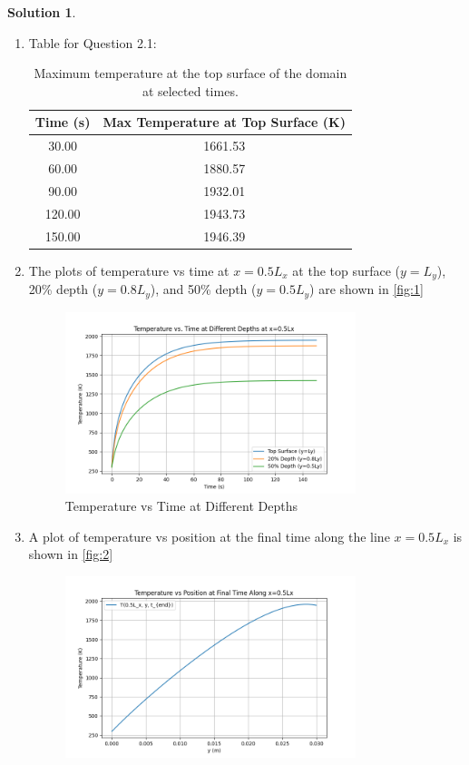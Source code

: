 \documentclass[12pt]{article}
\theoremstyle{definition} %
\newtheorem{solution}{Solution}
\theoremstyle{plain} %
\begin{document}
\begin{solution}
\begin{enumerate}
        \item Table for Question 2.1: \begin{table}[h!]
            \centering
            \begin{tabular}{|c|c|}
                \hline
                Time (s) & Max Temperature at Top Surface (K) \\ \hline
                30.00 & 1661.53 \\ \hline
                60.00 & 1880.57 \\ \hline
                90.00 & 1932.01 \\ \hline
                120.00 & 1943.73 \\ \hline
                150.00 & 1946.39 \\ \hline
            \end{tabular}
            \caption{Maximum temperature at the top surface of the domain at selected times.}
            \label{tab:maxtemp}
        \end{table}
    \item The plots of temperature vs time at $x = 0.5L_x$ at the top surface ($y = L_y$), 20\% depth ($y = 0.8L_y$), and 50\% depth ($y = 0.5L_y$) are shown in \autoref{fig:1}
     \begin{figure}[htbp]
        \centering
        \includegraphics[width=0.8\textwidth]{classes/tam-470/06-10/Figure_2-proj2.png}
        \caption{Temperature vs Time at Different Depths}
        \label{fig:1}
    \end{figure}
    \item A plot of temperature vs position at the final time along the line $x = 0.5L_x$ is shown in \autoref{fig:2}
     \begin{figure}[htbp]
        \centering
        \includegraphics[width=0.8\textwidth]{classes/tam-470/06-10/Figure_3-proj-2.png}

\end{figure}
\end{enumerate}
\end{solution}
\end{document}
